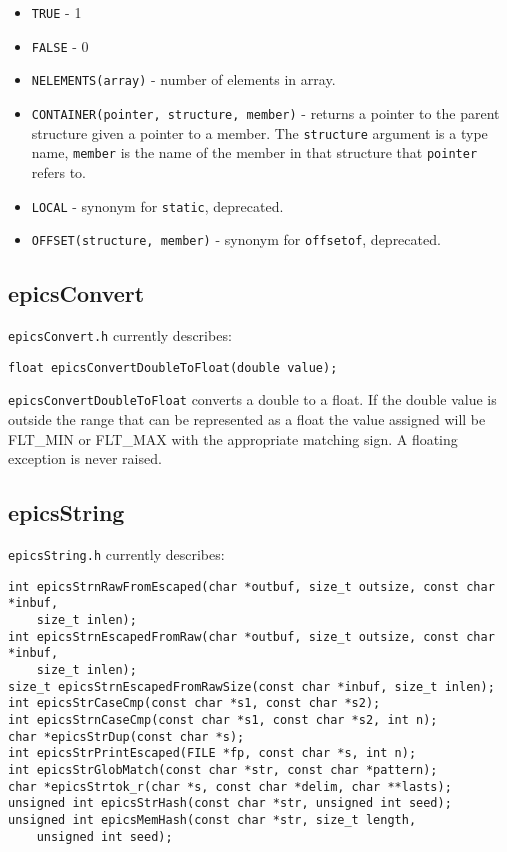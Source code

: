 \begin{itemize}

\item \verb|TRUE| - 1

\item \verb|FALSE| - 0

\item \verb|NELEMENTS(array)| - number of elements in array.

\item \verb|CONTAINER(pointer, structure, member)| - returns a pointer to the parent structure given a pointer to a member. The \verb|structure| argument is a type name, \verb|member| is the name of the member in that structure that \verb|pointer| refers to.

\item \verb|LOCAL| - synonym for \verb|static|, deprecated.

\item \verb|OFFSET(structure, member)| - synonym for \verb|offsetof|, deprecated.

\end{itemize}

\subsection{epicsConvert}

\verb|epicsConvert.h| currently describes:

\begin{verbatim}
float epicsConvertDoubleToFloat(double value);
\end{verbatim}

\verb|epicsConvertDoubleToFloat| converts a double to a float.
If the double value is outside the range that can be represented as a float the value assigned will be FLT\_MIN or FLT\_MAX with the appropriate matching sign.
A floating exception is never raised.

\subsection{epicsString}

\verb|epicsString.h| currently describes:

\begin{verbatim}
int epicsStrnRawFromEscaped(char *outbuf, size_t outsize, const char *inbuf,
    size_t inlen);
int epicsStrnEscapedFromRaw(char *outbuf, size_t outsize, const char *inbuf,
    size_t inlen);
size_t epicsStrnEscapedFromRawSize(const char *inbuf, size_t inlen);
int epicsStrCaseCmp(const char *s1, const char *s2);
int epicsStrnCaseCmp(const char *s1, const char *s2, int n);
char *epicsStrDup(const char *s);
int epicsStrPrintEscaped(FILE *fp, const char *s, int n);
int epicsStrGlobMatch(const char *str, const char *pattern);
char *epicsStrtok_r(char *s, const char *delim, char **lasts);
unsigned int epicsStrHash(const char *str, unsigned int seed);
unsigned int epicsMemHash(const char *str, size_t length,
    unsigned int seed);
\end{verbatim}

